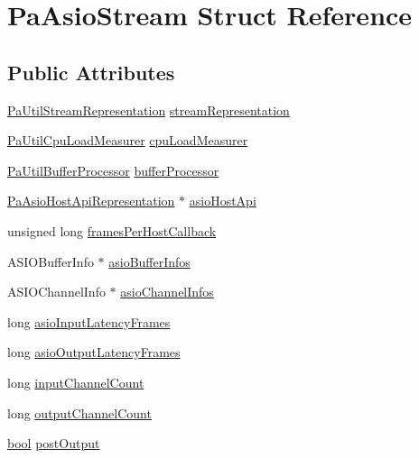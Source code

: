 \hypertarget{struct_pa_asio_stream}{}\section{Pa\+Asio\+Stream Struct Reference}
\label{struct_pa_asio_stream}
\subsection*{Public Attributes}
\begin{DoxyCompactItemize}
\item 
\hyperlink{struct_pa_util_stream_representation}{Pa\+Util\+Stream\+Representation} \hyperlink{struct_pa_asio_stream_ac67b5dffdcbfde1debd7dfca34e8a526}{stream\+Representation}
\item 
\hyperlink{struct_pa_util_cpu_load_measurer}{Pa\+Util\+Cpu\+Load\+Measurer} \hyperlink{struct_pa_asio_stream_a32a7ade601d41f7469a8eb14b3dd1828}{cpu\+Load\+Measurer}
\item 
\hyperlink{struct_pa_util_buffer_processor}{Pa\+Util\+Buffer\+Processor} \hyperlink{struct_pa_asio_stream_ac48d721d10bcdf041cc097b08493d684}{buffer\+Processor}
\item 
\hyperlink{struct_pa_asio_host_api_representation}{Pa\+Asio\+Host\+Api\+Representation} $\ast$ \hyperlink{struct_pa_asio_stream_aadaa880567a2dffd41250a28cdbf126f}{asio\+Host\+Api}
\item 
unsigned long \hyperlink{struct_pa_asio_stream_a6a4170ebada9b0e6068a704cedae5cdb}{frames\+Per\+Host\+Callback}
\item 
A\+S\+I\+O\+Buffer\+Info $\ast$ \hyperlink{struct_pa_asio_stream_abd7d016cead4b9363d2c8c6bdd85846d}{asio\+Buffer\+Infos}
\item 
A\+S\+I\+O\+Channel\+Info $\ast$ \hyperlink{struct_pa_asio_stream_a66dc7fa62cc467b47df44ccaa4580d6f}{asio\+Channel\+Infos}
\item 
long \hyperlink{struct_pa_asio_stream_a069cea1d45e377a6763350a3b0de5302}{asio\+Input\+Latency\+Frames}
\item 
long \hyperlink{struct_pa_asio_stream_a27a6dcaf68446e88becd22c68152fa60}{asio\+Output\+Latency\+Frames}
\item 
long \hyperlink{struct_pa_asio_stream_acf80c90b4ca3454b3643b2873724fdca}{input\+Channel\+Count}
\item 
long \hyperlink{struct_pa_asio_stream_a8d05870e5bf5bbace1bd680f3b300e8e}{output\+Channel\+Count}
\item 
\hyperlink{mac_2config_2i386_2lib-src_2libsoxr_2soxr-config_8h_abb452686968e48b67397da5f97445f5b}{bool} \hyperlink{struct_pa_asio_stream_af03bbc90652180dfed1499eae58f076d}{post\+Output}

\end{DoxyCompactItemize}

